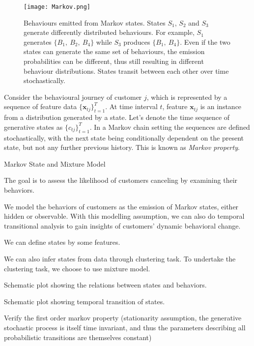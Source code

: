 \begin{figure}[!h]
\centering
\texttt{[image: Markov.png]}
\caption{Behaviours emitted from Markov states. States $S_1$, $S_2$ and $S_3$ generate differently distributed behaviours. For example, $S_1$ generates $\{ B_1, ~B_2, ~B_4\}$ while $S_3$ produces $\{ B_1, ~B_4\}$. Even if the two states can generate the same set of behaviours, the emission probabilities can be different, thus still resulting in different behaviour distributions. States transit between each other over time stochastically.}
\label{fig:markovChain}
\end{figure}

Consider the behavioural journey of customer $j$, which is represented by a sequence of feature data $\{ \mathbf{x}_{tj} \}_{t=1}^{T}$. At time interval $t$, feature $\mathbf{x}_{tj}$ is an instance from a distribution generated by a state. Let's denote the time sequence of generative states as $\{ c_{tj} \}_{t=1}^{T}$. In a Markov chain setting the sequences are defined stochastically, with the next state being conditionally dependent on the present state, but not any further previous history. This is known as \textit{Markov property}. 







Markov State and Mixture Model

The goal is to assess the likelihood of customers canceling by examining their behaviors.

We model the behaviors of customers as the emission of Markov states, either hidden or observable. With this modelling assumption, we can also do temporal transitional analysis to gain insights of customers' dynamic behavioral change.

We can define states by some features.

We can also infer states from data through clustering task. To undertake the clustering task, we choose to use mixture model. 




Schematic plot showing the relations between states and behaviors.

Schematic plot showing temporal transition of states.

Verify the first order markov property (stationarity assumption, the generative stochastic process is itself time invariant, and thus the parameters describing all probabilistic transitions are themselves constant)



